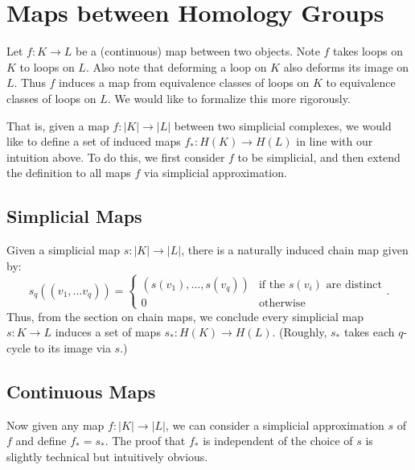 \section{Maps between Homology Groups}

Let $f: K \to L$ be a (continuous) map between two objects. Note $f$ takes loops on $K$ to loops on $L$. Also note that deforming a loop on $K$ also deforms its image on $L$. Thus $f$ induces a map from equivalence classes of loops on $K$ to equivalence classes of loops on $L$. We would like to formalize this more rigorously.

That is, given a map $f: |K| \to |L|$ between two simplicial complexes, we would like to define a set of induced maps $f_{*}: H(K) \to H(L)$ in line with our intuition above. To do this, we first consider $f$ to be simplicial, and then extend the definition to all maps $f$ via simplicial approximation.

\subsection{Simplicial Maps}
Given a simplicial map $s: |K| \to |L|$, there is a naturally induced chain map given by:
\[
    s_q\left((v_1, \dots v_q)\right) =
    \begin{cases}
        \left(s(v_1), \dots, s(v_q)\right) & \text{if the $s(v_i)$ are distinct} \\
        0 & \text{otherwise}
    \end{cases}.
\]
Thus, from the section on chain maps, we conclude every simplicial map $s: K \to L$ induces a set of maps $s_*: H(K) \to H(L)$. (Roughly, $s_*$ takes each $q$-cycle to its image via $s$.)

\subsection{Continuous Maps}
Now given any map $f: |K| \to |L|$, we can consider a simplicial approximation $s$ of $f$ and define $f_* = s_*$. The proof that $f_*$ is independent of the choice of $s$ is slightly technical but intuitively obvious.